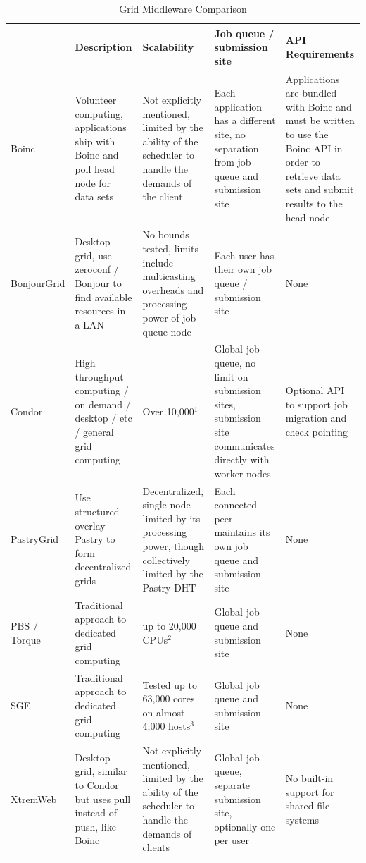 \documentclass[conference]{IEEEtran}
\begin{document}
\begin{table}[ht]
\small{
\centering
\begin{tabular}[c]{|p{1.4cm}||p{3.475cm}|p{3.475cm}|p{3.475cm}|p{3.475cm}|} \hline
& Description & Scalability & Job queue / submission site & API Requirements \\ \hline \hline
Boinc &
Volunteer computing, applications ship with Boinc and poll head node for data
sets &
Not explicitly mentioned, limited by the ability of the scheduler to handle
the demands of the client &
Each application has a different site, no separation from job queue and
submission site &
Applications are bundled with Boinc and must be written to use the Boinc API
in order to retrieve data sets and submit results to the head node
\\ \hline
BonjourGrid &
Desktop grid, use zeroconf / Bonjour to find available resources in a LAN &
No bounds tested, limits include multicasting overheads and processing power
of job queue node &
Each user has their own job queue / submission site &
None \\ \hline
Condor &
High throughput computing / on demand / desktop / etc / general grid computing &
Over 10,000$^{1}$ &
Global job queue, no limit on submission sites, submission site communicates directly with worker nodes &
Optional API to support job migration and check pointing \\ \hline
PastryGrid &
Use structured overlay Pastry to form decentralized grids &
Decentralized, single node limited by its processing power, though
collectively limited by the Pastry DHT &
Each connected peer maintains its own job queue and submission site &
None \\ \hline
PBS / Torque~\cite{torque} &
Traditional approach to dedicated grid computing &
up to 20,000 CPUs$^{2}$ &
Global job queue and submission site &
None
\\ \hline
SGE &
Traditional approach to dedicated grid computing &
Tested up to 63,000 cores on almost 4,000 hosts$^{3}$ &
Global job queue and submission site &
None
\\ \hline
XtremWeb &
Desktop grid, similar to Condor but uses pull instead of push, like Boinc &
Not explicitly mentioned, limited by the ability of the scheduler to handle
the demands of clients &
Global job queue, separate submission site, optionally one per user &
No built-in support for shared file systems
\\ \hline
\end{tabular}
\caption{Grid Middleware Comparison}
\label{tab:grid}
}
\end{table}
\end{document}
